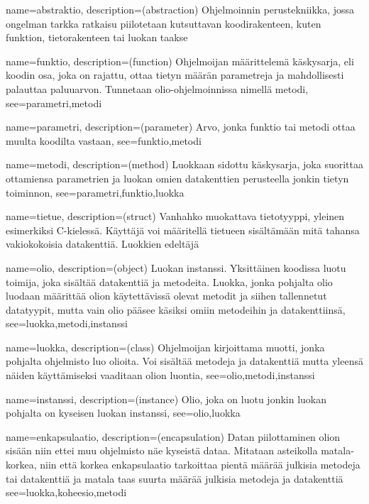 {
    name=abstraktio,
    description={(abstraction) Ohjelmoinnin perustekniikka, jossa ongelman
tarkka ratkaisu piilotetaan kutsuttavan koodirakenteen, kuten funktion, 
tietorakenteen tai luokan taakse}
}

{
    name=funktio,
    description={(function) Ohjelmoijan määrittelemä käskysarja, eli koodin
osa, joka on rajattu, ottaa tietyn määrän parametreja ja mahdollisesti
palauttaa paluuarvon. Tunnetaan olio-ohjelmoinnissa nimellä metodi},
    see={parametri,metodi}
}

{
    name=parametri,
    description={(parameter) Arvo, jonka funktio tai metodi ottaa muulta
koodilta vastaan},
    see={funktio,metodi}
}

{
    name=metodi,
    description={(method) Luokkaan sidottu käskysarja, joka suorittaa
ottamiensa parametrien ja luokan omien datakenttien perusteella jonkin tietyn
toiminnon},
    see={parametri,funktio,luokka}
}

{
    name=tietue,
    description={(struct) Vanhahko muokattava tietotyyppi, yleinen esimerkiksi
C-kielessä. Käyttäjä voi määritellä tietueen sisältämään mitä tahansa
vakiokokoisia datakenttiä. Luokkien edeltäjä}
}

{
    name=olio,
    description={(object) Luokan instanssi. Yksittäinen koodissa luotu
toimija, joka sisältää datakenttiä ja metodeita. Luokka, jonka pohjalta olio
luodaan määrittää olion käytettävissä olevat metodit ja siihen
tallennetut datatyypit, mutta vain olio pääsee käsiksi omiin metodeihin
ja datakenttiinsä},
    see={luokka,metodi,instanssi}
}

{
    name=luokka,
    description={(class) Ohjelmoijan kirjoittama muotti, jonka pohjalta
ohjelmisto luo olioita. Voi sisältää metodeja ja datakenttiä mutta yleensä
näiden käyttämiseksi vaaditaan olion luontia},
    see={olio,metodi,instanssi}
}

{
    name=instanssi,
    description={(instance) Olio, joka on luotu jonkin luokan pohjalta on
kyseisen luokan instanssi},
    see={olio,luokka}
}

{
    name=enkapsulaatio,
    description={(encapsulation) Datan piilottaminen olion sisään niin ettei
muu ohjelmisto näe kyseistä dataa. Mitataan asteikolla matala-korkea, niin että
korkea enkapsulaatio tarkoittaa pientä määrää julkisia metodeja tai datakenttiä
ja matala taas suurta määrää julkisia metodeja ja datakenttiä}
    see={luokka,koheesio,metodi}
}

